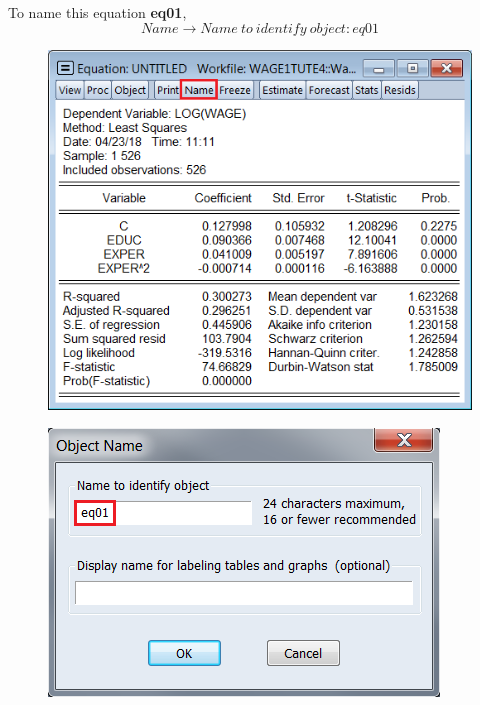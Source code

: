 \documentclass[12pt]{report}
\begin{document}
\noindent To name this equation \textbf{eq01},
$$Name \to Name\ to\ identify\ object: eq01$$
\begin{figure}[H]
	\centering
	\includegraphics{tute8_q1_2}
\end{figure}
\vspace{-\baselineskip}
\begin{figure}[H]
	\centering
	\includegraphics{q2_3}
\end{figure}
\vspace{-\baselineskip}
\end{document}
